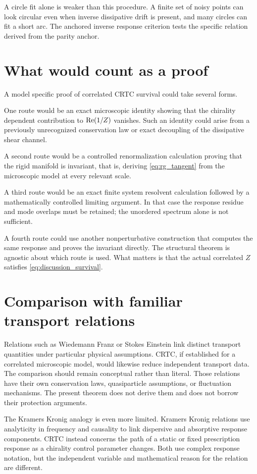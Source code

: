 A circle fit alone is weaker than this procedure. A finite set of noisy points can look circular even when inverse dissipative drift is present, and many circles can fit a short arc. The anchored inverse response criterion tests the specific relation derived from the parity anchor.

\section{What would count as a proof}
A model specific proof of correlated CRTC survival could take several forms.

One route would be an exact microscopic identity showing that the chirality dependent contribution to $\operatorname{Re}(1/Z)$ vanishes. Such an identity could arise from a previously unrecognized conservation law or exact decoupling of the dissipative shear channel.

A second route would be a controlled renormalization calculation proving that the rigid manifold is invariant, that is, deriving \cref{eq:rg_tangent} from the microscopic model at every relevant scale.

A third route would be an exact finite system resolvent calculation followed by a mathematically controlled limiting argument. In that case the response residue and mode overlaps must be retained; the unordered spectrum alone is not sufficient.

A fourth route could use another nonperturbative construction that computes the same response and proves the invariant directly. The structural theorem is agnostic about which route is used. What matters is that the actual correlated $Z$ satisfies \cref{eq:discussion_survival}.

\section{Comparison with familiar transport relations}
Relations such as Wiedemann Franz or Stokes Einstein link distinct transport quantities under particular physical assumptions. CRTC, if established for a correlated microscopic model, would likewise reduce independent transport data. The comparison should remain conceptual rather than literal. Those relations have their own conservation laws, quasiparticle assumptions, or fluctuation mechanisms. The present theorem does not derive them and does not borrow their protection arguments.

The Kramers Kronig analogy is even more limited. Kramers Kronig relations use analyticity in frequency and causality to link dispersive and absorptive response components. CRTC instead concerns the path of a static or fixed prescription response as a chirality control parameter changes. Both use complex response notation, but the independent variable and mathematical reason for the relation are different.

